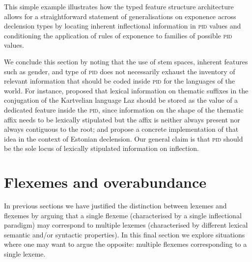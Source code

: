 \documentclass[output=paper]{langsci/langscibook}
\begin{document}
This simple example illustrates how the typed feature structure
architecture allows for a straightforward statement of generalisations
on exponence across declension types by locating inherent
inflectional information in \textsc{pid} values and conditioning the
application of rules of exponence to families of possible \textsc{pid}
values.

We conclude this section by noting that the use of stem spaces,
inherent features such as gender, and type of \textsc{pid} does not
necessarily exhaust the inventory of relevant information that should
be coded inside \textsc{pid} for the languages of the world.  For
instance, \citet{Bonami11e} proposed that lexical information on
thematic suffixes in the conjugation of the Kartvelian language Laz
should be stored as the value of a dedicated feature inside the
\textsc{pid}, since information on the shape of the thematic affix
needs to be lexically stipulated but the affix is neither always
present nor always contiguous to the root; and \citet{Crysmann17} propose a concrete implementation of that idea in the context of Estonian declension.
Our general claim is that
\textsc{pid} should be the sole locus of lexically stipulated
information on inflection.

\section{Flexemes and overabundance}
\label{sec:4}


In previous sections we have justified the distinction between lexemes
and flexemes by arguing that a single flexeme (characterised by a
single inflectional paradigm) may correspond to multiple lexemes
(characterised by different lexical semantic and/or syntactic
properties). In this final section we explore situations where one may
want to argue the opposite: multiple flexemes corresponding to a
single lexeme.
\end{document}
